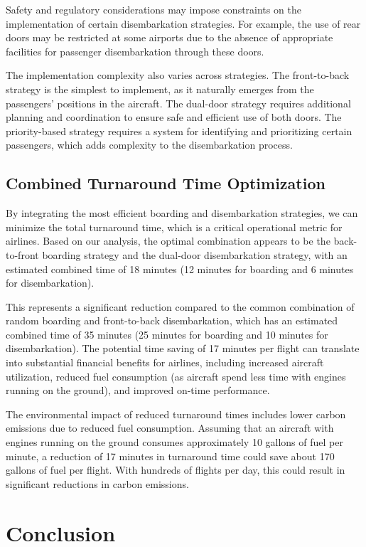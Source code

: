 Safety and regulatory considerations may impose constraints on the implementation of certain disembarkation strategies. For example, the use of rear doors may be restricted at some airports due to the absence of appropriate facilities for passenger disembarkation through these doors.

The implementation complexity also varies across strategies. The front-to-back strategy is the simplest to implement, as it naturally emerges from the passengers' positions in the aircraft. The dual-door strategy requires additional planning and coordination to ensure safe and efficient use of both doors. The priority-based strategy requires a system for identifying and prioritizing certain passengers, which adds complexity to the disembarkation process.

\subsection{Combined Turnaround Time Optimization}

By integrating the most efficient boarding and disembarkation strategies, we can minimize the total turnaround time, which is a critical operational metric for airlines. Based on our analysis, the optimal combination appears to be the back-to-front boarding strategy and the dual-door disembarkation strategy, with an estimated combined time of 18 minutes (12 minutes for boarding and 6 minutes for disembarkation).

This represents a significant reduction compared to the common combination of random boarding and front-to-back disembarkation, which has an estimated combined time of 35 minutes (25 minutes for boarding and 10 minutes for disembarkation). The potential time saving of 17 minutes per flight can translate into substantial financial benefits for airlines, including increased aircraft utilization, reduced fuel consumption (as aircraft spend less time with engines running on the ground), and improved on-time performance.

The environmental impact of reduced turnaround times includes lower carbon emissions due to reduced fuel consumption. Assuming that an aircraft with engines running on the ground consumes approximately 10 gallons of fuel per minute, a reduction of 17 minutes in turnaround time could save about 170 gallons of fuel per flight. With hundreds of flights per day, this could result in significant reductions in carbon emissions.

\section{Conclusion}
